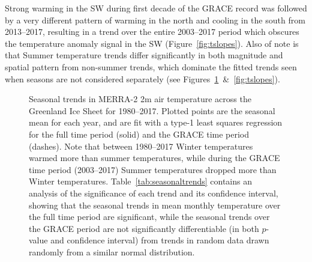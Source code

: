 \documentclass[11pt]{report}
\begin{document}

Strong warming in the SW during first decade of the GRACE record was followed by a very different pattern of warming in the north and cooling in the south from 2013--2017, resulting in a trend over the entire 2003--2017 period which obscures the temperature anomaly signal in the SW (Figure~\ref{fig:tslopes}). Also of note is that Summer temperature trends differ significantly in both magnitude and spatial pattern from non-summer trends, which dominate the fitted trends seen when seasons are not considered separately (see Figures~\ref{fig:seasonalclimate}~\&~\ref{fig:tslopes}).


 \begin{figure}[h]
\centering
{}
\caption[Seasonal 2m temperature trends over the Greenland Ice Sheet: 1980--2017]{Seasonal trends in MERRA-2 2m air temperature across the Greenland Ice Sheet for 1980--2017. Plotted points are the seasonal mean for each year, and are fit with a type-1 least squares regression for the full time period (solid) and the GRACE time period (dashes). Note that between 1980--2017 Winter temperatures warmed more than summer temperatures, while during the GRACE time period (2003--2017) Summer temperatures dropped more than Winter temperatures. Table~\ref{tab:seasonaltrends} contains an analysis of the significance of each trend and its confidence interval, showing that the seasonal trends in mean monthly temperature over the full time period are significant, while the seasonal trends over the GRACE period are not significantly differentiable (in both $p$-value and confidence interval) from trends in random data drawn randomly from a similar normal distribution. \label{fig:seasonalclimate}}
\end{figure}
\end{document}
